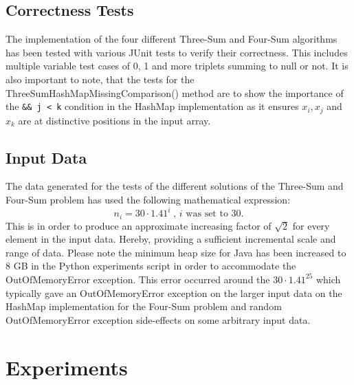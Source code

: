 \documentclass[12pt, a4paper]{article}
\begin{document}
\subsection{Correctness Tests}
The implementation of the four different Three-Sum and Four-Sum algorithms has been tested with various JUnit tests to verify their correctness. This includes multiple variable test cases of 0, 1 and more triplets summing to null or not.
\newline
It is also important to note, that the tests for the ThreeSumHashMapMissingComparison() method are to show the importance of the \texttt{\&\& j < k} condition in the HashMap implementation as it ensures \(x_i, x_j\) and \(x_k\) are at distinctive positions in the input array.

\subsection{Input Data}
The data generated for the tests of the different solutions of the Three-Sum and Four-Sum problem has used the following mathematical expression:
\[n_i = 30 \cdot 1.41^i\;\text{, } i \text{ was set to 30.}\]
This is in order to produce an approximate increasing factor of \(\sqrt{2}\) for every element in the input data. Hereby, providing a sufficient incremental scale and range of data.
\newline
Please note the minimum heap size for Java has been increased to 8 GB in the Python experiments script in order to accommodate the OutOfMemoryError exception. This error occurred around the \(30 \cdot 1.41^{25}\) which typically gave an OutOfMemoryError exception on the larger input data on the HashMap implementation for the Four-Sum problem and random OutOfMemoryError exception side-effects on some arbitrary input data.


\section{Experiments}
\end{document}
